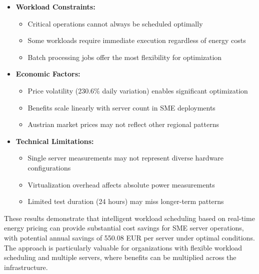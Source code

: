 \begin{itemize}
    \item \textbf{Workload Constraints:}
    \begin{itemize}
        \item Critical operations cannot always be scheduled optimally
        \item Some workloads require immediate execution regardless of energy costs
        \item Batch processing jobs offer the most flexibility for optimization
    \end{itemize}
    
    \item \textbf{Economic Factors:}
    \begin{itemize}
        \item Price volatility (230.6\% daily variation) enables significant optimization
        \item Benefits scale linearly with server count in SME deployments
        \item Austrian market prices may not reflect other regional patterns
    \end{itemize}
    
    \item \textbf{Technical Limitations:}
    \begin{itemize}
        \item Single server measurements may not represent diverse hardware configurations
        \item Virtualization overhead affects absolute power measurements
        \item Limited test duration (24 hours) may miss longer-term patterns
    \end{itemize}
\end{itemize}

These results demonstrate that intelligent workload scheduling based on real-time energy pricing can provide substantial cost savings for SME server operations, with potential annual savings of 550.08 EUR per server under optimal conditions. The approach is particularly valuable for organizations with flexible workload scheduling and multiple servers, where benefits can be multiplied across the infrastructure. 